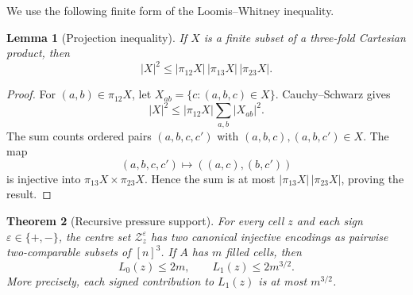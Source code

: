 \documentclass[11pt]{article}
\numberwithin{equation}{section}
\newtheorem{theorem}{Theorem}[section]
\newtheorem{lemma}[theorem]{Lemma}
\theoremstyle{definition}
\theoremstyle{remark}
\begin{document}
We use the following finite form of the Loomis--Whitney inequality.

\begin{lemma}[Projection inequality]\label{lem:projection-inequality}
If $X$ is a finite subset of a three-fold Cartesian product, then
\[
 |X|^2\le |\pi_{12}X|\,|\pi_{13}X|\,|\pi_{23}X|.
\]
\end{lemma}

\begin{proof}
For $(a,b)\in\pi_{12}X$, let $X_{ab}=\{c:(a,b,c)\in X\}$.  Cauchy--Schwarz
gives
\[
 |X|^2\le |\pi_{12}X|\sum_{a,b}|X_{ab}|^2.
\]
The sum counts ordered pairs $(a,b,c,c')$ with $(a,b,c),(a,b,c')\in X$.
The map
\[
 (a,b,c,c')\longmapsto((a,c),(b,c'))
\]
is injective into $\pi_{13}X\times\pi_{23}X$.  Hence the sum is at most
$|\pi_{13}X|\,|\pi_{23}X|$, proving the result.
\end{proof}

\begin{theorem}[Recursive pressure support]\label{thm:recursive-pressure}
For every cell $z$ and each sign $\varepsilon\in\{+,-\}$, the centre set
$\mathcal Z_z^\varepsilon$ has two canonical injective encodings as pairwise
two-comparable subsets of $[n]^3$.  If $A$ has $m$ filled cells, then
\begin{equation}\label{eq:pointwise-pressure}
 \boxed{L_0(z)\le2m,\qquad L_1(z)\le2m^{3/2}.}
\end{equation}
More precisely, each signed contribution to $L_1(z)$ is at most $m^{3/2}$.
\end{theorem}
\end{document}
